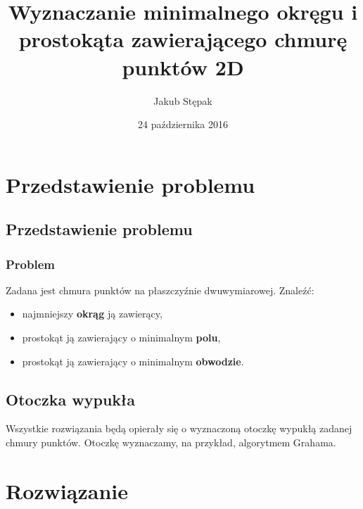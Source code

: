 \documentclass{beamer}
\title
[Minimalny okrąg i prostokąt na chmurze punktów]
{Wyznaczanie minimalnego okręgu i prostokąta zawierającego chmurę punktów 2D}
\author
[Jakub Stępak]
{Jakub Stępak}
\institute
[AGH]
{
Akademia Górniczo – Hutnicza w Krakowie
}
\date{24 października 2016}
\begin{document}
\frame{\titlepage}


\section{Przedstawienie problemu}

\subsection{Przedstawienie problemu}

\begin{frame}

\frametitle{Problem}
Zadana jest chmura punktów na płaszczyźnie dwuwymiarowej.
\linebreak
\linebreak
Znaleźć:
\begin{itemize}[-]
\item najmniejszy \textbf{okrąg} ją zawierący,
\item prostokąt ją zawierający o minimalnym \textbf{polu},
\item prostokąt ją zawierający o minimalnym \textbf{obwodzie}.
\end{itemize}

\end{frame}


\subsection{Otoczka wypukła}

\begin{frame}

Wszystkie rozwiązania będą opierały się o wyznaczoną otoczkę wypukłą zadanej chmury punktów. 
\linebreak 
\linebreak
Otoczkę wyznaczamy, na przykład, algorytmem Grahama.

\end{frame}


\section{Rozwiązanie}
\end{document}

